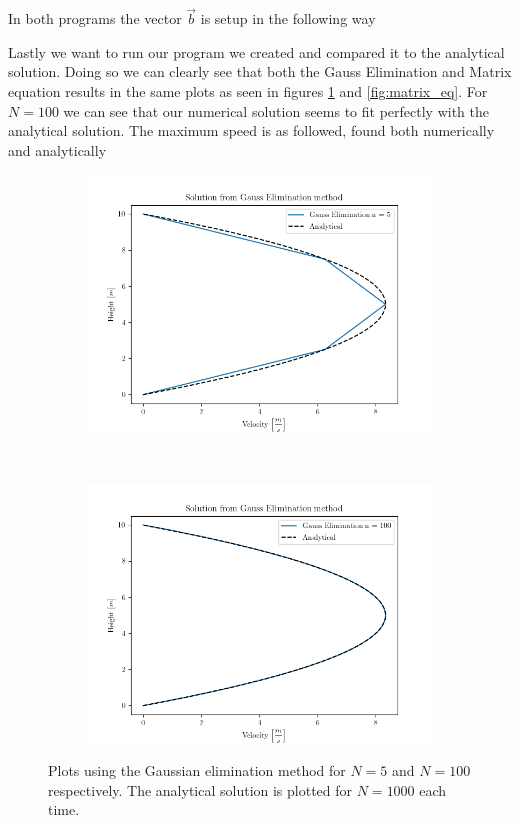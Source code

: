 \documentclass[10pt, a4paper]{amsart}
\begin{document}
In both programs the vector $\vec{b}$ is setup in the following way 


Lastly we want to run our program we created and compared it to the analytical solution. Doing so we can clearly see that both the Gauss Elimination and Matrix equation results in the same plots as seen in figures \ref{fig:gauss_elim} and \ref{fig:matrix_eq}. For $N = 100$ we can see that our numerical solution seems to fit perfectly with the analytical solution. The maximum speed is as followed, found both numerically and analytically 

\begin{figure}
	\centering
	\begin{subfigure}[b]{0.5\textwidth}
	\includegraphics[width=\textwidth]{./code/plot/plot_Gauss Elimination5.png}
	\end{subfigure}
	~
	\begin{subfigure}[b]{0.5\textwidth}
		\includegraphics[width=\textwidth]{./code/plot/plot_Gauss Elimination100.png}
	\end{subfigure}
	\caption{Plots using the Gaussian elimination method for $N 	= 5$ and $N = 100$ respectively. The analytical solution is plotted for $N = 1000$ each time.}
	\label{fig:gauss_elim}
\end{figure}
\end{document}
